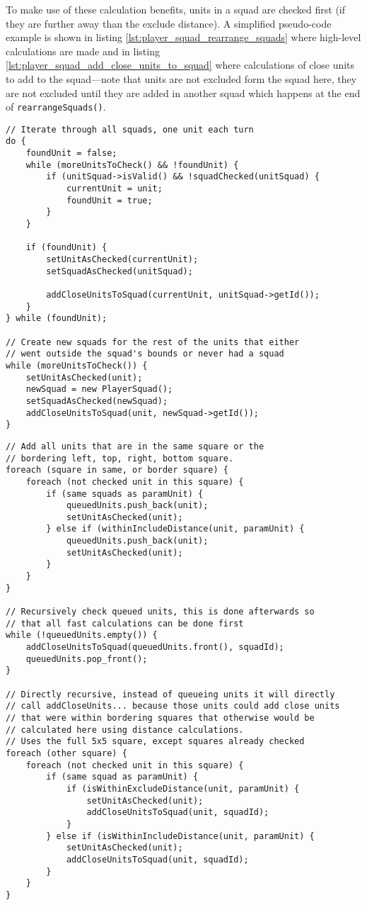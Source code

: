 To make use of these calculation benefits, units in a squad are checked first (if they are further away than the exclude distance). A simplified pseudo-code example is shown in listing \ref{lst:player_squad_rearrange_squads} where high-level calculations are made and in listing \ref{lst:player_squad_add_close_units_to_squad} where calculations of close units to add to the squad—note that units are not excluded form the squad here, they are not excluded until they are added in another squad which happens at the end of \texttt{rearrangeSquads()}.

\begin{lstlisting}[label={lst:player_squad_rearrange_squads},caption={Pseudo-code of \texttt{rearrangeSquads()}}]
// Iterate through all squads, one unit each turn
do {
	foundUnit = false;
	while (moreUnitsToCheck() && !foundUnit) {
		if (unitSquad->isValid() && !squadChecked(unitSquad) {
			currentUnit = unit;
			foundUnit = true;
		}
	}
	
	if (foundUnit) {
		setUnitAsChecked(currentUnit);
		setSquadAsChecked(unitSquad);
		
		addCloseUnitsToSquad(currentUnit, unitSquad->getId());
	}
} while (foundUnit);

// Create new squads for the rest of the units that either
// went outside the squad's bounds or never had a squad
while (moreUnitsToCheck()) {
	setUnitAsChecked(unit);
	newSquad = new PlayerSquad();
	setSquadAsChecked(newSquad);
	addCloseUnitsToSquad(unit, newSquad->getId());
}
\end{lstlisting}

\begin{lstlisting}[label={lst:player_squad_add_close_units_to_squad},caption={Pseudo-code of \texttt{addCloseUnitsToSquad()}}]
// Add all units that are in the same square or the
// bordering left, top, right, bottom square.
foreach (square in same, or border square) {
	foreach (not checked unit in this square) {
		if (same squads as paramUnit) {
			queuedUnits.push_back(unit);
			setUnitAsChecked(unit);
		} else if (withinIncludeDistance(unit, paramUnit) {
			queuedUnits.push_back(unit);
			setUnitAsChecked(unit);
		}
	}
}

// Recursively check queued units, this is done afterwards so
// that all fast calculations can be done first
while (!queuedUnits.empty()) {
	addCloseUnitsToSquad(queuedUnits.front(), squadId);
	queuedUnits.pop_front();
}

// Directly recursive, instead of queueing units it will directly
// call addCloseUnits... because those units could add close units
// that were within bordering squares that otherwise would be
// calculated here using distance calculations.
// Uses the full 5x5 square, except squares already checked
foreach (other square) {
	foreach (not checked unit in this square) {
		if (same squad as paramUnit) {
			if (isWithinExcludeDistance(unit, paramUnit) {
				setUnitAsChecked(unit);
				addCloseUnitsToSquad(unit, squadId);
			}
		} else if (isWithinIncludeDistance(unit, paramUnit) {
			setUnitAsChecked(unit);
			addCloseUnitsToSquad(unit, squadId);
		}
	}
}
\end{lstlisting}


